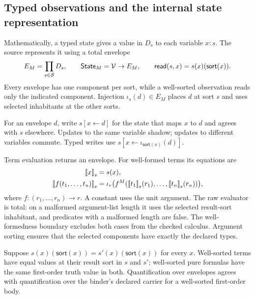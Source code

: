 \subsection{Typed observations and the internal state representation}
Mathematically, a typed state gives a value in $D_s$ to each variable $x:s$.
The source represents it using a total envelope
\[
 E_M=\prod_{s\in\mathcal{S}}D_s,
 \qquad \mathsf{State}_M=\mathcal{V}\to E_M,
 \qquad \mathsf{read}(s,x)=s(x)(\mathsf{sort}(x)).
\]
Every envelope has one component per sort, while a well-sorted observation
reads only the indicated component. Injection $\iota_s(d)\in E_M$ places
$d$ at sort $s$ and uses selected inhabitants at the other sorts.

For an envelope $d$, write $s[x\leftarrow d]$ for the state that maps $x$ to
$d$ and agrees with $s$ elsewhere. Updates to the same variable shadow;
updates to different variables commute. Typed writes use
$s[x\leftarrow\iota_{\mathsf{sort}(x)}(d)]$.

Term evaluation returns an envelope. For well-formed terms its equations are
\begin{align*}
 \eval{x}{s}&=s(x),\\
 \eval{f(t_1,\ldots,t_n)}{s}
   &=\iota_r\bigl(f^M(\eval{t_1}{s}(r_1),\ldots,\eval{t_n}{s}(r_n))\bigr),
\end{align*}
where $f:(r_1,\ldots,r_n)\to r$. A constant uses the unit argument.
The raw evaluator is total: on a malformed argument-list length it uses the
selected result-sort inhabitant, and predicates with a malformed length
are false. The well-formedness boundary excludes both cases from the checked
calculus. Argument sorting ensures that the selected components have exactly
the declared types.

\begin{proposition}
Suppose $s(x)(\mathsf{sort}(x))=s'(x)(\mathsf{sort}(x))$ for every $x$.
Well-sorted terms have equal values at their result sort in $s$ and $s'$;
well-sorted pure formulas have the same first-order truth value in both.
Quantification over envelopes agrees with quantification over the binder's
declared carrier for a well-sorted first-order body.
\end{proposition}

